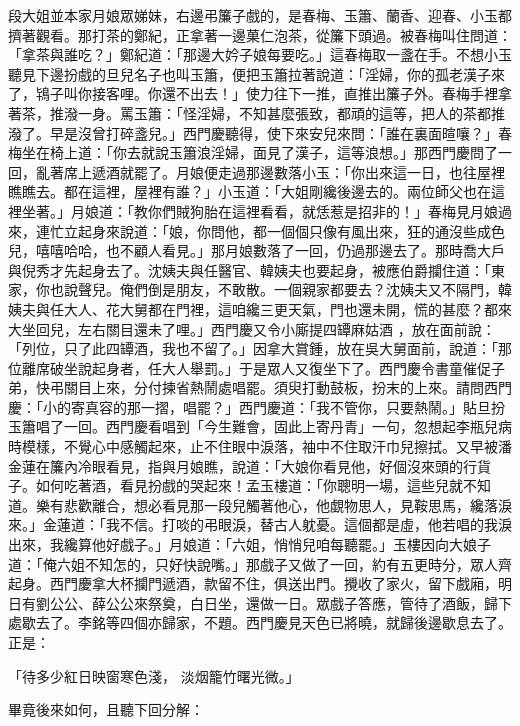 \begin{showcontents}{}
段大姐並本家月娘眾娣妹，右邊弔簾子戲的，是春梅、玉簫、蘭香、迎春、小玉都擠著觀看。那打茶的鄭紀，正拿著一邊菓仁泡茶，從簾下頭過。被春梅叫住問道：「拿茶與誰吃？」鄭紀道：「那邊大妗子娘每要吃。」這春梅取一盞在手。不想小玉聽見下邊扮戲的旦兒名子也叫玉簫，便把玉簫拉著說道：「淫婦，你的孤老漢子來了，鴇子叫你接客哩。你還不出去！」使力往下一推，直推出簾子外。春梅手裡拿著茶，推潑一身。罵玉簫：「怪淫婦，不知甚麼張致，都頑的這等，把人的茶都推潑了。早是沒曾打碎盞兒。」西門慶聽得，使下來安兒來問：「誰在裏面暄嚷？」春梅坐在椅上道：「你去就說玉簫浪淫婦，面見了漢子，這等浪想。」那西門慶問了一回，亂著席上遞酒就罷了。月娘便走過那邊數落小玉：「你出來這一日，也往屋裡瞧瞧去。都在這裡，屋裡有誰？」小玉道：「大姐剛纔後邊去的。兩位師父也在這裡坐著。」月娘道：「教你們賊狗胎在這裡看看，就恁惹是招非的！」春梅見月娘過來，連忙立起身來說道：「娘，你問他，都一個個只像有風出來，狂的通沒些成色兒，嘻嘻哈哈，也不顧人看見。」那月娘數落了一回，仍過那邊去了。那時喬大戶與倪秀才先起身去了。沈姨夫與任醫官、韓姨夫也要起身，被應伯爵攔住道：「東家，你也說聲兒。俺們倒是朋友，不敢散。一個親家都要去？沈姨夫又不隔門，韓姨夫與任大人、花大舅都在門裡，這咱纔三更天氣，門也還未開，慌的甚麼？都來大坐回兒，左右關目還未了哩。」西門慶又令小廝提四罈麻姑酒 ，放在面前說：「列位，只了此四罈酒，我也不留了。」因拿大賞鍾，放在吳大舅面前，說道：「那位離席破坐說起身者，任大人舉罰。」于是眾人又復坐下了。西門慶令書童催促子弟，快弔關目上來，分付揀省熱鬧處唱罷。須臾打動鼓板，扮末的上來。請問西門慶：「小的寄真容的那一摺，唱罷？」西門慶道：「我不管你，只要熱鬧。」貼旦扮玉簫唱了一回。西門慶看唱到「今生難會，固此上寄丹青」一句，忽想起李瓶兒病時模樣，不覺心中感觸起來，止不住眼中淚落，袖中不住取汗巾兒擦拭。又早被潘金蓮在簾內冷眼看見，指與月娘瞧，說道：「大娘你看見他，好個沒來頭的行貨子。如何吃著酒，看見扮戲的哭起來！孟玉樓道：「你聰明一場，這些兒就不知道。樂有悲歡離合，想必看見那一段兒觸著他心，他覷物思人，見鞍思馬，纔落淚來。」金蓮道：「我不信。打啖的弔眼淚，替古人躭憂。這個都是虛，他若唱的我淚出來，我纔算他好戲子。」月娘道：「六姐，悄悄兒咱每聽罷。」玉樓因向大娘子道：「俺六姐不知怎的，只好快說嘴。」那戲子又做了一回，約有五更時分，眾人齊起身。西門慶拿大杯攔門遞酒，款留不住，俱送出門。攪收了家火，留下戲廂，明日有劉公公、薛公公來祭奠，白日坐，還做一日。眾戲子答應，管待了酒飯，歸下處歇去了。李銘等四個亦歸家，不題。西門慶見天色已將曉，就歸後邊歇息去了。正是：

「待多少紅日映窗寒色淺，  淡烟籠竹曙光微。」

畢竟後來如何，且聽下回分解：



\end{showcontents}


